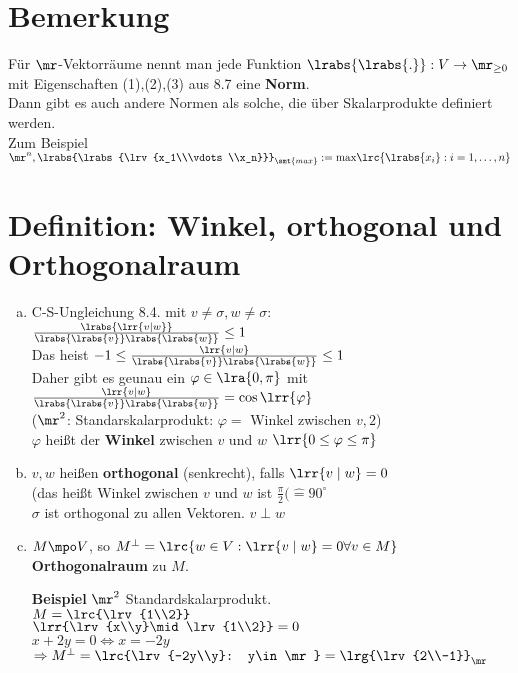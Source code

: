 \section{Bemerkung}
	Für $\mr$-Vektorräume nennt man jede Funktion $\lrabs{\lrabs{.}}:V\rightarrow\mr_{\geq 0}$ mit Eigenschaften (1),(2),(3) aus 8.7 eine \textbf{Norm}.\\
	Dann gibt es auch andere Normen als solche, die über Skalarprodukte definiert werden.\\
	Zum Beispiel $\mr^n, \lrabs{\lrabs{\lrv{x_1\\\vdots\\x_n}}}_{\smt{max}}:=\mbox{max}\lrc{\lrabs{x_i}:i=1,\dots,n}$

\section{Definition: Winkel, orthogonal und Orthogonalraum}
	\begin{enumerate}[a)]
		\item C-S-Ungleichung 8.4. mit $v\neq\sigma, w\neq\sigma$:\\
			$\frac{\lrabs{\lrr{v\mid w}}}{\lrabs{\lrabs{v}}\lrabs{\lrabs{w}}}\leq 1$\\
			Das heist $-1\leq\frac{\lrr{v\mid w}}{\lrabs{\lrabs{v}}\lrabs{\lrabs{w}}}\leq 1$\\
			Daher gibt es geunau ein $\varphi\in\lra{0,\pi}$ mit $\frac{\lrr{v\mid w}}{\lrabs{\lrabs{v}}\lrabs{\lrabs{w}}}=\cos\lrr{\varphi}$\\
			($\mr^2$: Standarskalarprodukt: $\varphi=$ Winkel zwischen $v,2$)\\
			$\varphi$ heißt der \textbf{Winkel} zwischen $v$ und $w$ $\lrr{0\leq\varphi\leq\pi}$
		\item $v,w$ heißen \textbf{orthogonal} (senkrecht), falls $\lrr{v\mid w}=0$\\
			(das heißt Winkel zwischen $v$ und $w$ ist $\frac{\pi}{2}(\hat{=}90^\circ$\\
			$\sigma$ ist orthogonal zu allen Vektoren. $v \perp w$
		\item $M\mpo V$, so $M^\perp=\lrc{w\in V:\lrr{v\mid w}=0\forall v\in M}$\\
			\textbf{Orthogonalraum} zu $M$.

			\textbf{Beispiel} $\mr^2$ Standardskalarprodukt.\\
				$M=\lrc{\lrv{1\\2}}$\\
				$\lrr{\lrv{x\\y}\mid\lrv{1\\2}}=0$\\
				$x+2y=0\Leftrightarrow x=-2y$\\
				$\Rightarrow M^\perp=\lrc{\lrv{-2y\\y}: y\in\mr}=\lrg{\lrv{2\\-1}}_\mr$
	\end{enumerate}


